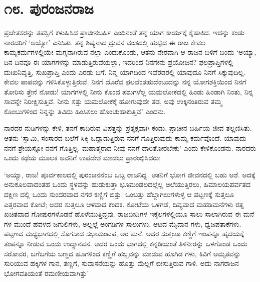 
\chapter{೧೮. ಪುರಂಜನರಾಜ}

ಪ್ರಚೇತಸರನ್ನು ತಪಸ್ಸಿಗೆ ಕಳುಹಿಸಿದ ಪ್ರಾಚೀನಬರ್ಹಿ ಎಂದಿನಂತೆ ತನ್ನ ಯಾಗ ಕಾರ್ಯಕ್ಕೆ ಕೈಹಾಕಿದ. ಇದನ್ನು ಕಂಡು ನಾರದರಿಗೆ ‘ಅಯ್ಯೋ’ ಎನಿಸಿತು. ತನ್ನ ಶಿಷ್ಯನಾದ ಧ್ರುವನ ವಂಶದಲ್ಲಿ ಹುಟ್ಟಿದ ಈ ರಾಜ ಕೇವಲ ಕಾಮ್ಯಕರ್ಮಗಳಲ್ಲಿಯೇ ಮಗ್ನನಾಗಿರುವ ನಲ್ಲಾ ಎಂದುಕೊಂಡು, ಆತನು ನೇರವಾಗಿ ಆ ರಾಜನ ಬಳಿಗೆ ಬಂದು ‘ಅಯ್ಯಾ, ದಿನ ದಿನವೂ ಈ ಯಾಗಗಳನ್ನು ಮಾಡುತ್ತಿರುವೆಯಲ್ಲಾ, ಇದರಿಂದ ನಿನಗೇನು ಪ್ರಯೋಜನ? ಫಲಪ್ರಾಪ್ತಿಗಳಲ್ಲಿ ದುಃಖನಿವೃತ್ತಿ, ಸುಖಪ್ರಾಪ್ತಿ ಎಂದು ಎರಡು ಬಗೆ. ನಿನ್ನ ಯಾಗದಿಂದ ಇವೆರಡರಲ್ಲಿ ಯಾವುದೂ ನಿನಗೆ ಸಿಕ್ಕುವುದಿಲ್ಲ. ಕೇವಲ ಪಾಪವನ್ನು ಗಳಿಸಿಕೊಳ್ಳುತ್ತಿರುವೆ. ನಿನಗೆ ದೊರೆವ ಫಲವೆಂತಹುದೆಂಬುದನ್ನು ನನ್ನ ಯೋಗಶಕ್ತಿಯಿಂದ ನಿನಗೆ ತೋರಿಸು ತ್ತೇನೆ ನೋಡು! ಯಾಗಗಳಲ್ಲಿ ನೀನು ಕೊಂದ ಪಶುಗಳೆಲ್ಲ ಯಮಲೋಕದಲ್ಲಿ ಹಿಂಡು ಹಿಂಡಾಗಿ ನಿಂತು, ನಿನ್ನ ಸಾವನ್ನೇ ನಿರೀಕ್ಷಿಸುತ್ತಿವೆ. ನೀನು ಸತ್ತು ಯಮಲೋಕಕ್ಕೆ ಹೋಗುವುದೇ ತಡ, ಅವು ಉಕ್ಕಿನಂತಿರುವ ತಮ್ಮ ಕೊಂಬುಗಳಿಂದ ನಿನ್ನನ್ನು ತಿವಿದು ಹಿಂಸಿಸಲು ಹೊಂಚುಹಾಕುತ್ತಿವೆ’ ಎಂದನು.

ನಾರದರ ನುಡಿಗಳನ್ನು ಕೇಳಿ, ತನಗೆ ಕಾದಿರುವ ವಿಪತ್ತನ್ನು ಪ್ರತ್ಯಕ್ಷವಾಗಿ ಕಂಡು, ಪ್ರಾಚೀನ ಬರ್ಹಿಯ ಜೀವ ತಲ್ಲಣಿಸಿತು. ಆತನು ‘ಸ್ವಾಮಿ, ಸಂಸಾರದ ಬಲೆಗೆ ಸಿಕ್ಕಿ ಒದ್ದಾಡುತ್ತಿರುವ ನನಗೆ ಗೊತ್ತಿರುವುದು ಕಾಮ್ಯ ಕರ್ಮವೊಂದೆ. ಯಾವುದು ನನಗೆ ಶ್ರೇಯಸ್ಸೋ ನನಗೆ ಗೊತ್ತಿಲ್ಲ. ಮಹಾತ್ಮರಾದ ನೀವು ನನಗೆ ದಾರಿತೋರಬೇಕು’ ಎಂದು ಕೇಳಿಕೊಂಡನು. ನಾರದರು ಒಂದು ಕಥೆಯ ಮೂಲಕ ಅವನಿಗೆ ಉಪದೇಶ ಮಾಡಲು ಪ್ರಾರಂಭಿಸಿದರು:

‘ಅಯ್ಯಾ, ರಾಜ! ಪೂರ್ವಕಾಲದಲ್ಲಿ ಪುರಂಜನನೆಂಬ ಒಬ್ಬ ರಾಜನಿದ್ದ. ಆತನಿಗೆ ಭೋಗ ಜೀವನದಲ್ಲಿ ಬಹು ಆಶೆ. ಅದಕ್ಕೆ ಅನುಕೂಲವಾದಂತಹ ಒಂದು ಸ್ಥಳವನ್ನು ಹುಡುಕುತ್ತಾ ಭೂಮಂಡಲದಲ್ಲೆಲ್ಲ ಅಲೆಯುತ್ತಿರಲು, ಹಿಮಾಲಯಪರ್ವತದ ದಕ್ಷಿಣ ದಲ್ಲಿ ಒಂದು ಸುಂದರವಾದ ನಗರ ಕಣ್ಣಿಗೆ ಬಿತ್ತು. ಒಂಬತ್ತು ಹೆಬ್ಬಾಗಿಲುಗಳುಳ್ಳ ಆ ಪಟ್ಟಣಕ್ಕೆ ಸುತ್ತಲೂ ಎತ್ತರವಾದ ಕೋಟೆ; ಅದರ ಸುತ್ತಲೂ ಆಳವಾದ ಕಂದಕ. ಕೋಟೆಯ ಒಳಗಡೆ, ದಿವ್ಯವಾದ ಮಹಡಿಮನೆಗಳು ರತ್ನ ಖಚಿತವಾದ ಗೋಪುರಗಳೊಡನೆ ಹೊಳೆಯುತ್ತಿದ್ದವು. ರಾಜಬೀದಿಗಳ ಇಕ್ಕೆಲಗಳಲ್ಲಿಯೂ ಸಾಲು ಸಾಲಾಗಿರುವ ಈ ಮನೆ ಗಳ ಮುಂದೆ ಹವಳದ ಜಗುಲಿಗಳು, ಅಲ್ಲಲ್ಲೆ ಅಂಗಡಿಗಳ ಸಾಲುಗಳು, ಆಟದ ಮೈದಾನ ಗಳು, ಧ್ವಜಪತಾಕೆಗಳು. ಪಟ್ಟಣದ ಮಧ್ಯಭಾಗದಲ್ಲಿ ಸೊಗಸಾದ ಸಭಾಮಂಟಪ, ಅರ ಮನೆ. ಅದರ ಸುತ್ತಲೂ ಕಣ್ಣಿಗೆ ಇಂಪನ್ನೂ ಹೃದಯಕ್ಕೆ ತಂಪನ್ನೂ ನೀಡುವ ಒಂದು ಉದ್ಯಾನವನ. ಅದರ ಒಂದು ಭಾಗದಲ್ಲಿ ಕನ್ನಡಿಯಂತೆ ತಿಳಿನೀರನ್ನು ಒಳಗೊಂಡ ಒಂದು ಸರೋವರ, ಬಗೆಬಗೆಯ ಬಣ್ಣದ ಹೂಗಳಿಂದ ಕಣ್ಣಿಗೆ ಹಬ್ಬವನ್ನು ಮಾಡುವ ಹೂಗಿಡ ಗಳು, ಕಿವಿಗೆ ಅಮೃತವನ್ನು ಸುರಿಯುವ ಹಕ್ಕಿಗಳ ಗಾನ, ತಣ್ಣಗೆ, ಸುವಾಸನೆಯನ್ನು ಹೊತ್ತು ಮೆಲ್ಲಗೆ ಬೀಸುತ್ತಿರುವ ಗಾಳಿ. ಅದು ನಾಗರಾಜನ ಭೋಗವತಿಯಂತೆ ರಮಣೀಯವಾಗಿತ್ತು’

